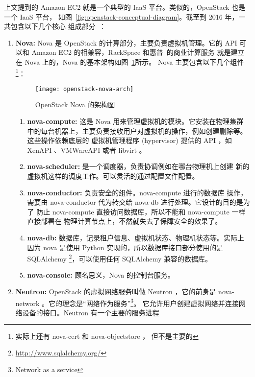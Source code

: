 上文提到的 Amazon EC2 就是一个典型的 IaaS 平台。类似的，OpenStack 也是一个 IaaS 平台，
如图~\ref{fig:openstack-conceptual-diagram}。截至到 2016 年，一共包含以下几个核心
组成部分~\cite{openstack}：

\begin{enumerate}
    \item \textbf{Nova:} Nova 是 OpenStack 的计算部分，主要负责虚拟机管理。它的 API
    可以和 Amazon EC2 的相兼容，RackSpace 和惠普~\cite{hpe-openstack}的商业计算服务
    就是建立在 Nova 上的，Nova 的基本架构如图~\ref{fig:openstack-nova-arch}所示。
    Nova 主要包含以下几个组件\footnote{实际上还有 nova-cert 和 nova-objectstore ，
    但不是主要的}：
    \begin{figure}[h]
        \centering
        \texttt{[image: openstack-nova-arch]}
        \caption{OpenStack Nova 的架构图}
        \label{fig:openstack-nova-arch}
    \end{figure}
    \begin{enumerate}
        \item \textbf{nova-compute:} 这是 Nova 用来管理虚拟机的模块。它安装在物理集群
        中的每台机器上，主要负责接收用户对虚拟机的操作，例如创建删除等。这些操作依赖底层的
        虚拟机管理程序 (hypervisor) 提供的 API ，如 XenAPI 、VMWareAPI
         或者 libvirt 。
        \item \textbf{nova-scheduler:} 是一个调度器，负责协调例如在哪台物理机上创建
        新的虚拟机这样的调度工作。可以灵活的通过配置文件配置。
        \item \textbf{nova-conductor:} 负责安全的组件。nova-compute 进行的数据库
        操作，需要由 nova-conductor 代为转交给 nova-db 进行处理。它设计的目的是为了
        防止 nova-compute 直接访问数据库，所以不能和 nova-compute 一样直接部署在
        物理计算节点上，不然就失去了保障安全的效果了。~\cite{conductor}
        \item \textbf{nova-db:} 数据库，记录租户信息、虚拟机状态、物理机状态等。实际上
        因为 nova 是使用 Python 实现的，所以数据库接口部分使用的是 SQLAlchemy
         \footnote{\url{http://www.sqlalchemy.org/}}，可以使用任何 SQLAlchemy
         兼容的数据库。
        \item \textbf{nova-console:} 顾名思义，Nova 的控制台服务。
    \end{enumerate}
    \item \textbf{Neutron:} OpenStack 的虚拟网络服务叫做 Neutron ，它的前身是
     nova-network 。它的理念是“网络作为服务”\footnote{Network as a service}。
    它允许用户创建虚拟网络并连接网络设备的接口。Neutron 有一个主要的服务进程

\end{enumerate}
